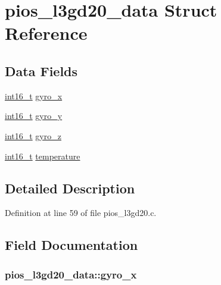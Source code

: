 \hypertarget{structpios__l3gd20__data}{\section{pios\-\_\-l3gd20\-\_\-data Struct Reference}
\label{structpios__l3gd20__data}
}
\subsection*{Data Fields}
\begin{DoxyCompactItemize}
\item 
\hyperlink{stdint_8h_aa343fa3b3d06292b959ffdd4c4703b06}{int16\-\_\-t} \hyperlink{structpios__l3gd20__data_a5dea5aad2af2bb014e26e8b588afe25f}{gyro\-\_\-x}
\item 
\hyperlink{stdint_8h_aa343fa3b3d06292b959ffdd4c4703b06}{int16\-\_\-t} \hyperlink{structpios__l3gd20__data_a2254f9fac6f52d089cd6fb6b4ac59102}{gyro\-\_\-y}
\item 
\hyperlink{stdint_8h_aa343fa3b3d06292b959ffdd4c4703b06}{int16\-\_\-t} \hyperlink{structpios__l3gd20__data_ac96a0621539a472ffc044b6246663835}{gyro\-\_\-z}
\item 
\hyperlink{stdint_8h_aa343fa3b3d06292b959ffdd4c4703b06}{int16\-\_\-t} \hyperlink{structpios__l3gd20__data_a51c36a0ee690ccc92f547888f0898759}{temperature}
\end{DoxyCompactItemize}


\subsection{Detailed Description}


Definition at line 59 of file pios\-\_\-l3gd20.\-c.



\subsection{Field Documentation}
\hypertarget{structpios__l3gd20__data_a5dea5aad2af2bb014e26e8b588afe25f}{
\subsubsection[{gyro\-\_\-x}]{ pios\-\_\-l3gd20\-\_\-data\-::gyro\-\_\-x}}\label{structpios__l3gd20__data_a5dea5aad2af2bb014e26e8b588afe25f}


